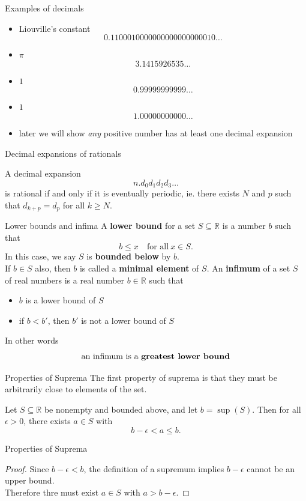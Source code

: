 \documentclass{beamer}
\begin{document}
\begin{frame}{Examples of decimals}
\begin{itemize}
\item Liouville's constant
$$0.1100010000000000000000010\dots$$
\pause
\item $\pi$
$$3.1415926535\dots$$
\pause
\item $1$
$$0.99999999999\dots$$
\pause
\item $1$
$$1.00000000000\dots$$
\pause
\item later we will show \emph{any} positive number has at least one decimal expansion
\end{itemize}
\end{frame}

\begin{frame}{Decimal expansions of rationals}
\begin{thm}
A decimal expansion
$$n.d_0d_1d_2d_3\dots$$
is rational if and only if it is eventually periodic, ie. there exists $N$ and $p$ such that $d_{k+p} = d_p$ for all $k\geq N$.
\end{thm}
\end{frame}

\begin{frame}{Lower bounds and infima}
A \textbf{lower bound} for a set $S\subseteq\mathbb{R}$ is a number $b$ such that
$$b \leq x\quad\text{for all}\ x\in S.$$
\pause
In this case, we say $S$ is \textbf{bounded below} by $b$.\\
\pause
If $b\in S$ also, then $b$ is called a \textbf{minimal element} of $S$.
\pause
An \textbf{infimum} of a set $S$ of real numbers is a real number $b\in\mathbb{R}$ such that
\begin{itemize}
\item $b$ is a lower bound of $S$
\item if $b<b'$, then $b'$ is not a lower bound of $S$
\end{itemize}
\pause
In other words
$$\text{an infimum is a \bf{greatest lower bound}}$$
\end{frame}

\begin{frame}{Properties of Suprema}
The first property of suprema is that they must be arbitrarily close to elements of the set.
\begin{thm}
Let $S\subseteq\mathbb{R}$ be nonempty and bounded above, and let $b = \sup(S)$.
Then for all $\epsilon > 0$, there exists $a\in S$ with
$$b-\epsilon < a \leq b.$$
\end{thm}
\end{frame}
\begin{frame}{Properties of Suprema}
\begin{proof}
Since $b-\epsilon < b$, the definition of a supremum implies $b-\epsilon$ cannot be an upper bound.\\
\pause
Therefore thre must exist $a\in S$ with $a > b-\epsilon$.
\end{proof}
\end{frame}
\end{document}
